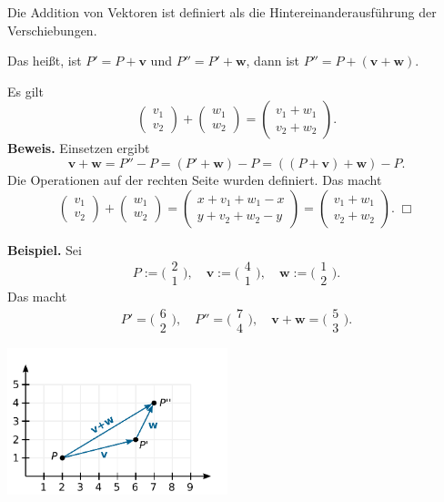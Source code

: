 \documentclass[9pt]{beamer}
\newcommand{\bv}[1]{\mathbf{#1}}
\newcommand{\strong}[1]{\textsf{\textbf{#1}}}
\renewcommand{\qedsymbol}{\ensuremath{\Box}}
\newcommand{\icol}[1]{
  \big(\!\begin{smallmatrix}#1\end{smallmatrix}\!\big)%
}
\newcommand{\parspace}{\vspace{0.8em}}
\begin{document}
\begin{frame}
Die Addition von Vektoren ist definiert als die Hintereinanderausführung
der Verschiebungen.

\parspace
Das heißt, ist $P' = P+\bv v$ und $P'' = P'+\bv w$,
dann ist $P'' = P+(\bv v+\bv w)$.\pause

\parspace
Es gilt
\[\begin{pmatrix}v_1\\ v_2\end{pmatrix} + \begin{pmatrix}w_1\\ w_2\end{pmatrix}
= \begin{pmatrix}v_1+w_1\\ v_2+w_2\end{pmatrix}.\]\pause
\strong{Beweis.} Einsetzen ergibt
\[\bv v+\bv w = P''-P = (P'+\bv w)-P = ((P+\bv v)+\bv w)-P.\]
Die Operationen auf der rechten Seite wurden definiert. Das macht
\[\begin{pmatrix}v_1\\ v_2\end{pmatrix} + \begin{pmatrix}w_1\\ w_2\end{pmatrix}
= \begin{pmatrix}x + v_1 + w_1 - x\\ y + v_2 + w_2 - y\end{pmatrix}
= \begin{pmatrix}v_1 + w_1\\ v_2 + w_2\end{pmatrix}.\;\qedsymbol\]
\end{frame}

\begin{frame}
\strong{Beispiel.} Sei
\[P:=\icol{2\\ 1},\quad
\bv v := \icol{4\\ 1},\quad \bv w := \icol{1\\ 2}.\]\pause
Das macht
\[P' = \icol{6\\ 2},\quad P'' = \icol{7\\ 4}, \quad\bv v+\bv w = \icol{5\\ 3}.\]

\vspace{-1em}
\begin{center}
\includegraphics[width=64mm]{img/vec-addition.pdf}
\end{center}
\end{frame}
\end{document}
